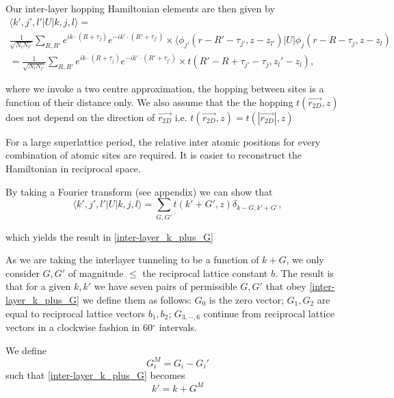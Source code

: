 \documentclass[12pt]{report} %
\begin{document}
  Our inter-layer hopping Hamiltonian elements are then given by
  \begin{multline}
    \langle k',j',l' | U | k, j, l \rangle = \\
    \frac{1}{\sqrt{N_l N_{l'}}} \sum_{R, R'} e^{ik \cdot (R+\tau_j)} e^{-ik' \cdot (R' + \tau_{j'})} \times \langle \phi_{j'}(r - R' - \tau_{j'}, z - z_{l'}) | U | \phi_j (r - R - \tau_j, z - z_l)\\
     =\frac{1}{\sqrt{N_l N_{l'}}} \sum_{R, R'} e^{ik \cdot (R+\tau_j)} e^{-ik' \cdot (R' + \tau_{j'})} \times t(R'-R +\tau_{j'} - \tau_j, z_l' - z_l),
    \label{}
  \end{multline}

  where we invoke a two centre approximation, the hopping between sites is a function of their distance only. We also assume that the the hopping $t(\vec{r_{2D}}, z)$ does not depend on the direction of $\vec{r_{2D}}$ i.e. $t(\vec{r_{2D}}, z) = t(|\vec{r_{2D}}|, z)$

  For a large superlattice period, the relative inter atomic positions for every combination of atomic sites are required. It is easier to reconstruct the Hamiltonian in reciprocal space.

  By taking a Fourier transform (see appendix) we can show that
  \begin{equation}
    \langle k',j',l' | U | k, j, l \rangle = \sum_{G, G'} t(k'+G', z) \delta_{k-G, k'+G'},
    \label{inter-layer_hopping_elements}
  \end{equation}
  
  which yields the result in \ref{inter-layer_k_plus_G}
  
  As we are taking the interlayer tunneling to be a function of $k+G$, we only consider $G, G'$ of magnitude $\leq$ the reciprocal lattice constant $b$. The result is that for a given $k, k'$ we have seven pairs of permissible $G, G'$ that obey \ref{inter-layer_k_plus_G} we define them as follows: $G_0$ is the zero vector; $G_1, G_2$ are equal to reciprocal lattice vectors $b_1, b_2$; $G_{3,\cdots,6}$ continue from reciprocal lattice vectors in a clockwise fashion in 60$^\circ$ intervals.

  We define
  \begin{equation}
    G_i^M = G_i - G_i'
    \label{inter-layer_G_M_def}
  \end{equation}
  such that \ref{inter-layer_k_plus_G} becomes
  \begin{equation}
    k' = k + G^M
    \label{inter-layer_k_plus_G_M}
  \end{equation}
\end{document}
